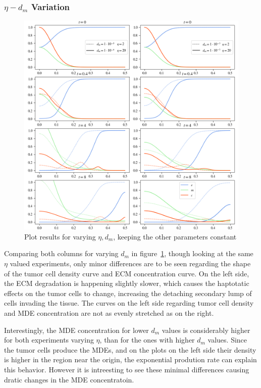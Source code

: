 \subsubsection*{$\eta - d_m$ Variation}
\begin{figure}[h!]
 \centering
 \includegraphics[width=\textwidth]{resources/images/dm_eta_variation.png}
 \caption{Plot results for varying $\eta, d_m$, keeping the other parameters constant}
 \label{fig:dm_eta_variation}
\end{figure}

Comparing both columns for varying $d_m$ in figure~\ref{fig:dm_eta_variation}, though looking at the same $\eta$ valued experiments, only minor differences are to be seen regarding the shape of the tumor cell density curve and ECM concentration curve. On the left side, the ECM degradation is happening slightly slower, which causes the haptotatic effects on the tumor cells to change, increasing the detaching secondary lump of cells invading the tissue. The curves on the left side regarding tumor cell density and MDE concentration are not as evenly stretched as on the right.

Interestingly, the MDE concentration for lower $d_m$ values is considerably higher for both experiments varying $\eta$, than for the ones with higher $d_m$ values. Since the tumor cells produce the MDEs, and on the plots on the left side their density is higher in the region near the origin, the exponential prodution rate can explain this behavior. However it is intreesting to see these minimal differences causing dratic changes in the MDE concentratoin. 

